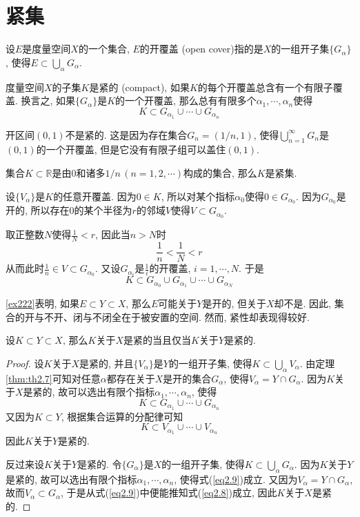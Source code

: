 \documentclass[cn,12pt,math=mtpro2,citestyle=gb7714-2015,bibstyle=gb7714-2015,twocol]{elegantbook}
\newcommand{\R}{\mathbb{R}}
\begin{document}
\section{紧集}
\begin{definition}
设$E$是度量空间$X$的一个集合, $E$的开覆盖 (open cover)指的是$X$的一组开子集$\{G_\alpha\}$, 使得$E\subset\bigcup_\alpha G_\alpha$.
\end{definition}
\begin{definition}
度量空间$X$的子集$K$是紧的 (compact), 如果$K$的每个开覆盖总含有一个有限子覆盖. 换言之, 如果$\{G_\alpha\}$是$K$的一个开覆盖, 那么总有有限多个$\alpha_1,\cdots,\alpha_n$使得
$$K\subset G_{\alpha_1}\cup\cdots\cup G_{\alpha_n}$$
\end{definition}
\begin{example}
开区间$(0,1)$不是紧的. 这是因为存在集合$G_n=(1/n, 1)$, 使得$ \bigcup_{n=1}^\infty G_n$是$(0,1)$的一个开覆盖, 但是它没有有限子组可以盖住$(0,1)$.
\end{example}
\begin{example}
集合$K\subset\R$是由$0$和诸多$1/n\,(n=1,2,\cdots)$构成的集合, 那么$K$是紧集.

设$\{V_\alpha\}$是$K$的任意开覆盖. 因为$0\in K$, 所以对某个指标$\alpha_0$使得$0\in G_{\alpha_0}$. 因为$G_{\alpha_0}$是开的, 所以存在$0$的某个半径为$r$的邻域$V$使得$V\subset G_{\alpha_0}$.

取正整数$N$使得$\displaystyle\frac{1}{N}<r$, 因此当$n>N$时
$$\frac{1}{n}<\frac{1}{N}<r$$
从而此时$\displaystyle\frac{1}{n}\in V\subset G_{\alpha_0}$. 又设$G_{\alpha_i}$是$\displaystyle\frac{1}{i}$的开覆盖, $i=1,\cdots,N$. 于是
$$K\subset G_{\alpha_0}\cup G_{\alpha_1}\cup\cdots\cup G_{\alpha_N}$$
\end{example}
\ref{ex222}表明, 如果$E\subset Y\subset X$, 那么$E$可能关于$Y$是开的, 但关于$X$却不是. 因此, 集合的开与不开、闭与不闭全在于被安置的空间. 然而, 紧性却表现得较好.
\begin{theorem}
  设$K\subset Y\subset X$, 那么$K$关于$X$是紧的当且仅当$K$关于$Y$是紧的.
\end{theorem}
\begin{proof}
  设$K$关于$X$是紧的, 并且$\{V_\alpha\}$是$Y$的一组开子集, 使得$ K\subset\bigcup_{\alpha}V_\alpha$. 由定理\ref{thm:th2.7}可知对任意$\alpha$都存在关于$X$是开的集合$G_\alpha$, 使得$V_\alpha=Y\cap G_\alpha$. 因为$K$关于$X$是紧的, 故可以选出有限个指标$\alpha_1,\cdots,\alpha_n$, 使得
    \begin{equation}\label{eq2.8}
    K\subset G_{\alpha_1}\cup\cdots\cup G_{\alpha_n}
    \end{equation}
    又因为$K\subset Y$, 根据集合运算的分配律可知
    \begin{equation}\label{eq2.9}
    K\subset V_{\alpha_1}\cup\cdots\cup V_{\alpha_n}
    \end{equation}
    因此$K$关于$Y$是紧的.

    反过来设$K$关于$Y$是紧的. 令$\{G_\alpha\}$是$X$的一组开子集, 使得$ K\subset\bigcup_{\alpha}G_\alpha$. 因为$K$关于$Y$是紧的, 故可以选出有限个指标$\alpha_1,\cdots,\alpha_n$, 使得式(\ref{eq2.9})成立. 又因为$V_\alpha=Y\cap G_\alpha$, 故而$V_\alpha\subset G_\alpha$, 于是从式(\ref{eq2.9})中便能推知式(\ref{eq2.8})成立, 因此$K$关于$X$是紧的.
\end{proof}
\end{document}
